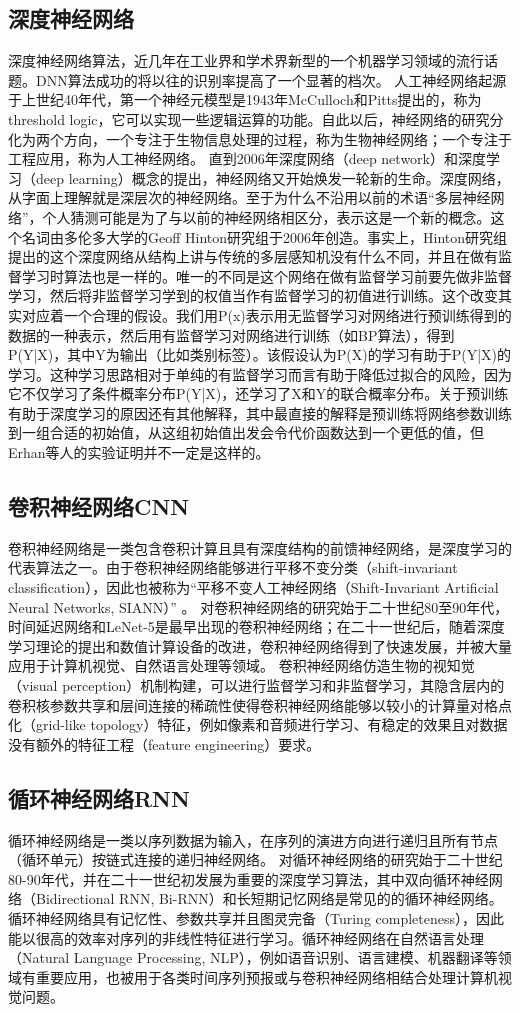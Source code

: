 \documentclass[UTF8]{ctexart}
\begin{document}
\subsection{深度神经网络}
深度神经网络算法，近几年在工业界和学术界新型的一个机器学习领域的流行话题。DNN算法成功的将以往的识别率提高了一个显著的档次。
人工神经网络起源于上世纪40年代，第一个神经元模型是1943年McCulloch和Pitts提出的，称为threshold logic，它可以实现一些逻辑运算的功能。自此以后，神经网络的研究分化为两个方向，一个专注于生物信息处理的过程，称为生物神经网络；一个专注于工程应用，称为人工神经网络。
直到2006年深度网络（deep network）和深度学习（deep learning）概念的提出，神经网络又开始焕发一轮新的生命。深度网络，从字面上理解就是深层次的神经网络。至于为什么不沿用以前的术语“多层神经网络”，个人猜测可能是为了与以前的神经网络相区分，表示这是一个新的概念。这个名词由多伦多大学的Geoff Hinton研究组于2006年创造。事实上，Hinton研究组提出的这个深度网络从结构上讲与传统的多层感知机没有什么不同，并且在做有监督学习时算法也是一样的。唯一的不同是这个网络在做有监督学习前要先做非监督学习，然后将非监督学习学到的权值当作有监督学习的初值进行训练。这个改变其实对应着一个合理的假设。我们用P(x)表示用无监督学习对网络进行预训练得到的数据的一种表示，然后用有监督学习对网络进行训练（如BP算法），得到P(Y|X)，其中Y为输出（比如类别标签）。该假设认为P(X)的学习有助于P(Y|X)的学习。这种学习思路相对于单纯的有监督学习而言有助于降低过拟合的风险，因为它不仅学习了条件概率分布P(Y|X)，还学习了X和Y的联合概率分布。关于预训练有助于深度学习的原因还有其他解释，其中最直接的解释是预训练将网络参数训练到一组合适的初始值，从这组初始值出发会令代价函数达到一个更低的值，但Erhan等人的实验证明并不一定是这样的。
\subsection{卷积神经网络CNN}
卷积神经网络是一类包含卷积计算且具有深度结构的前馈神经网络，是深度学习的代表算法之一。由于卷积神经网络能够进行平移不变分类（shift-invariant classification），因此也被称为“平移不变人工神经网络（Shift-Invariant Artificial Neural Networks, SIANN）” 。
对卷积神经网络的研究始于二十世纪80至90年代，时间延迟网络和LeNet-5是最早出现的卷积神经网络；在二十一世纪后，随着深度学习理论的提出和数值计算设备的改进，卷积神经网络得到了快速发展，并被大量应用于计算机视觉、自然语言处理等领域。
卷积神经网络仿造生物的视知觉（visual perception）机制构建，可以进行监督学习和非监督学习，其隐含层内的卷积核参数共享和层间连接的稀疏性使得卷积神经网络能够以较小的计算量对格点化（grid-like topology）特征，例如像素和音频进行学习、有稳定的效果且对数据没有额外的特征工程（feature engineering）要求。
\subsection{循环神经网络RNN}
循环神经网络是一类以序列数据为输入，在序列的演进方向进行递归且所有节点（循环单元）按链式连接的递归神经网络。
对循环神经网络的研究始于二十世纪80-90年代，并在二十一世纪初发展为重要的深度学习算法，其中双向循环神经网络（Bidirectional RNN, Bi-RNN）和长短期记忆网络是常见的的循环神经网络。
循环神经网络具有记忆性、参数共享并且图灵完备（Turing completeness），因此能以很高的效率对序列的非线性特征进行学习。循环神经网络在自然语言处理（Natural Language Processing, NLP），例如语音识别、语言建模、机器翻译等领域有重要应用，也被用于各类时间序列预报或与卷积神经网络相结合处理计算机视觉问题。
\end{document}
